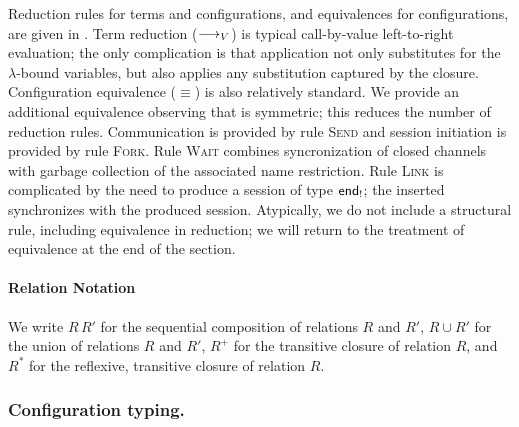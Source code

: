 \documentclass[oribibl,orivec,envcountsame]{llncs}
\begin{document}
Reduction rules for terms and configurations, and equivalences for configurations, are given in
. Term reduction ($\longrightarrow_V$) is typical call-by-value left-to-right evaluation;
the only complication is that application not only substitutes for the $\lambda$-bound variables,
but also applies any substitution captured by the closure. Configuration equivalence ($\equiv$) is
also relatively standard. We provide an additional equivalence observing that  is
symmetric; this reduces the number of reduction rules. Communication is provided by rule
\textsc{Send} and session initiation is provided by rule \textsc{Fork}. Rule \textsc{Wait} combines
syncronization of closed channels with garbage collection of the associated name restriction.  Rule
\textsc{Link} is complicated by the need to produce a session of type $\mathsf{end}_!$; the inserted
 synchronizes with the produced session. Atypically, we do not include a structural
rule, including equivalence in reduction; we will return to the treatment of equivalence at the end
of the section.

\paragraph{Relation Notation}
We write $R\,R'$ for the sequential composition of relations $R$ and $R'$, $R \cup R'$ for the union
of relations $R$ and $R'$, $R^+$ for the transitive closure of relation $R$, and $R^*$ for the
reflexive, transitive closure of relation $R$.

\subsubsection{Configuration typing.}
\end{document}
